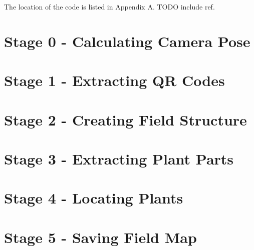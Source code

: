 The location of the code is listed in Appendix A.  TODO include ref.

\section{Stage 0 - Calculating Camera Pose}
\label{processing-stage0}


\section{Stage 1 - Extracting QR Codes}
\label{processing-stage1}

\section{Stage 2 - Creating Field Structure}
\label{processing-stage2}

\section{Stage 3 - Extracting Plant Parts}
\label{processing-stage3}

\section{Stage 4 - Locating Plants}
\label{processing-stage4}

\section{Stage 5 - Saving Field Map}
\label{processing-stage5}

